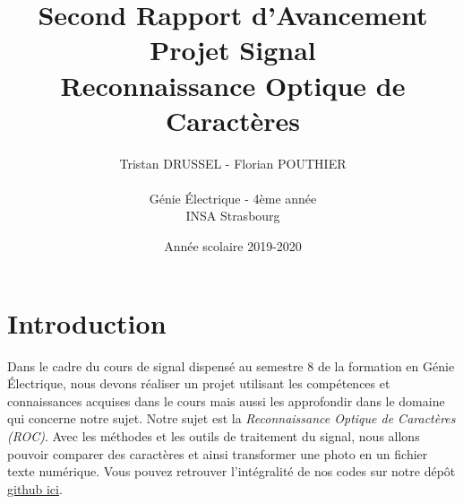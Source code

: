 \documentclass[a4paper,12pt,titlepage]{report}
\title{Second Rapport d'Avancement Projet Signal\\Reconnaissance Optique de Caractères}
\author{Tristan DRUSSEL - Florian POUTHIER \\ \\ Génie Électrique - 4ème année\\ INSA Strasbourg}
\date{Année scolaire 2019-2020}
\begin{document}
	\begin{titlepage}
		\maketitle
	\end{titlepage}
	\tableofcontents
	\newpage
	\section{Introduction}
		Dans le cadre du cours de signal dispensé au semestre 8 de la formation en Génie Électrique, nous devons réaliser un projet utilisant les compétences et connaissances acquises dans le cours mais aussi les approfondir dans le domaine qui concerne notre sujet.
		Notre sujet est la \textit{Reconnaissance Optique de Caractères (ROC)}. Avec les méthodes et les outils de traitement du signal, nous allons pouvoir comparer des caractères et ainsi transformer une photo en un fichier texte numérique. Vous pouvez retrouver l'intégralité de nos codes sur notre dépôt \href{https://github.com/tristanplouz/ProjetSignal}{github ici}.
\end{document}
